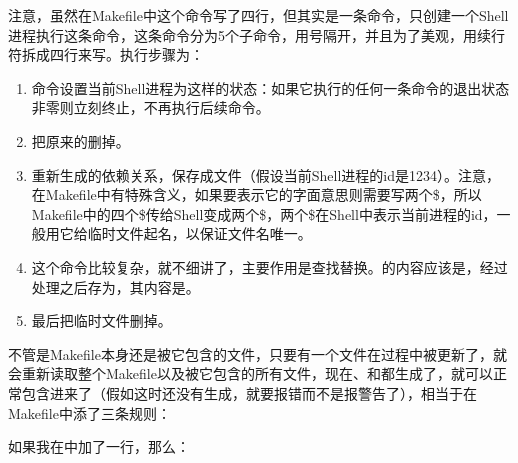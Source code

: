 

注意，虽然在Makefile中这个命令写了四行，但其实是一条命令，只创建一个Shell进程执行这条命令，这条命令分为5个子命令，用\BookCode{;\BookSplit{}}号隔开，并且为了美观，用续行符\BookCode{\textbackslash{}}拆成四行来写。执行步骤为：


\begin{enumerate}

\item {}命令设置当前Shell进程为这样的状态：如果它执行的任何一条命令的退出状态非零则立刻终止，不再执行后续命令。

\item 把原来的删掉。

\item 重新生成的依赖关系，保存成文件（假设当前Shell进程的id是1234）。注意，在Makefile中\BookCode{\$}有特殊含义，如果要表示它的字面意思则需要写两个\$，所以Makefile中的四个\$传给Shell变成两个\$，两个\$在Shell中表示当前进程的id，一般用它给临时文件起名，以保证文件名唯一。

\item 这个命令比较复杂，就不细讲了，主要作用是查找替换。的内容应该是，经过处理之后存为，其内容是。

\item 最后把临时文件删掉。
\end{enumerate}


不管是Makefile本身还是被它包含的文件，只要有一个文件在过程中被更新了，就会重新读取整个Makefile以及被它包含的所有文件，现在、和都生成了，就可以正常包含进来了（假如这时还没有生成，就要报错而不是报警告了），相当于在Makefile中添了三条规则：




如果我在中加了一行，那么：



